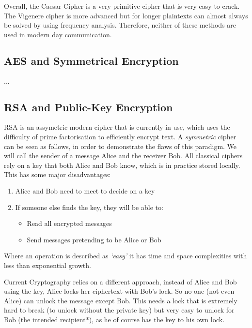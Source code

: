 \documentclass{article}
\begin{document}
Overall, the Caesar Cipher is a very primitive cipher that is very easy to
crack. The Vigenere cipher is more advanced but for longer plaintexts can
almost always be solved by using frequency analysis. Therefore, neither of
these methods are used in modern day communication.

\subsection{AES and Symmetrical Encryption}
   ...

\subsection{RSA and Public-Key Encryption}
RSA is an assymetric modern cipher that is currently in use, which uses the
difficulty of prime factorisation to efficiently encrypt text.
A \textit{symmetric} cipher can be seen as follows, in order to demonstrate the 
flaws of this paradigm.
\medskip
We will call the sender of a message Alice and the receiver Bob.
All classical ciphers rely on a key that both Alice and Bob know, which is 
in practice stored locally.
This has some major disadvantages:

\begin{enumerate}
   \item Alice and Bob need to meet to decide on a key
   \item If someone else finds the key, they will be able to:

   \begin{itemize}
      \item Read all encrypted messages
      \item Send messages pretending to be Alice or Bob
   \end{itemize}

\end{enumerate}

Where an operation is described as \textit{\lq{}easy\rq{}} it has time and
space complexities with less than exponential growth.

Current Cryptography relies on a different approach, instead of Alice and Bob
using the key, Alice locks her ciphertext with Bob's lock. So no-one (not even
Alice) can unlock the message except Bob. This needs a lock that is extremely
hard to break (to unlock without the private key) but very easy to unlock for
Bob (the intended recipient*), as he of course has the key to his own lock.
\end{document}
